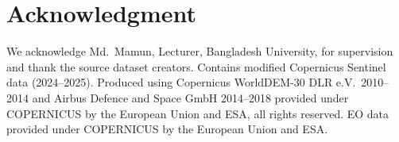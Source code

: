 \documentclass[conference]{IEEEtran}
\begin{document}
\section*{Acknowledgment}
We acknowledge Md.\ Mamun, Lecturer, Bangladesh University, for supervision and thank the source dataset creators. Contains modified Copernicus Sentinel data (2024--2025). Produced using Copernicus WorldDEM-30 \textcopyright{} DLR e.V.\ 2010--2014 and \textcopyright{} Airbus Defence and Space GmbH 2014--2018 provided under COPERNICUS by the European Union and ESA, all rights reserved. EO data provided under COPERNICUS by the European Union and ESA.

\FloatBarrier
{}


\end{document}

